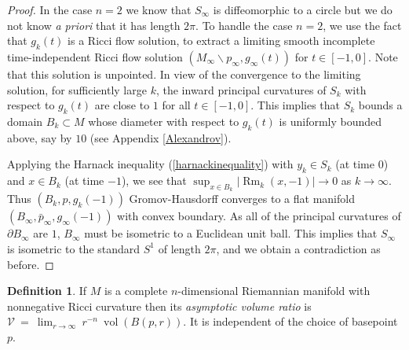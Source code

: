 \documentclass[12pt]{amsart}
\newcommand{\Rm}{\operatorname{Rm}}
\newcommand{\vol}{\operatorname{vol}}
\newcommand{\ra}{\rightarrow}
\numberwithin{equation}{section}
\theoremstyle{plain}
\theoremstyle{definition}
\newtheorem{definition}[equation]{Definition}
\theoremstyle{remark}
\begin{document}
\begin{proof}
In the case $n=2$ we know that $S_\infty$ is diffeomorphic to a circle but
we do not know {\it a priori} that it has length $2\pi$.
To handle the case $n = 2$, we use the fact that $g_k(t)$ is
a Ricci flow solution, to
extract a limiting smooth incomplete
time-independent Ricci flow solution 
$(M_\infty \backslash p_\infty, g_\infty(t))$ for $t \in [-1, 0]$.
Note that this solution is unpointed.
In view of the
convergence to the limiting solution,
for sufficiently large $k$,
the inward principal curvatures of $S_k$ with respect to $g_k(t)$
are close to $1$ for all $t\in [-1,0]$. 
This implies that
$S_k$ bounds a domain $B_k\subset M$ whose diameter with
respect to $g_k(t)$ is uniformly bounded above, say by $10$ 
(see Appendix \ref{Alexandrov}).

Applying the Harnack
inequality (\ref{harnackinequality}) 
with $y_k\in S_k$ (at time $0$) and $x\in B_k$
(at time $-1$), we see that 
$\sup_{x\in B_k}|\Rm_k(x,-1)|\ra 0$ as $k\ra \infty$.  
Thus $(B_k,p,g_k(-1))$ Gromov-Hausdorff converges to a flat manifold 
$(B_\infty,\bar p_\infty,g_\infty(-1))$
with convex boundary. As all of the principal curvatures of
$\partial B_\infty$ are $1$,
$B_\infty$ must be isometric to a Euclidean unit ball.
This implies that $S_\infty$ is isometric to the standard $S^1$ of
length $2\pi$, 
and we obtain a contradiction as before.
\end{proof}

\begin{definition}
If $M$ is a complete $n$-dimensional
Riemannian manifold with nonnegative Ricci curvature
then its {\em asymptotic
volume ratio} is ${\mathcal V} \: = \:
\lim_{r \rightarrow \infty} \: r^{-n} \: \vol(B(p, r))$. It is independent
of the choice of basepoint $p$.
\end{definition}
\end{document}
